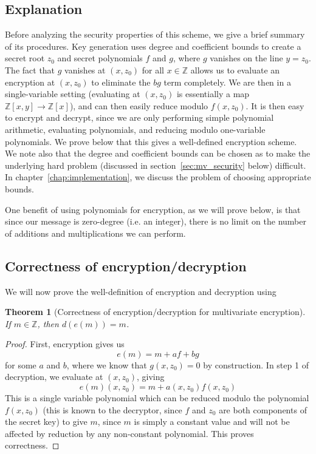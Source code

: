 \documentclass[11pt]{report}
\newtheorem{thm}{Theorem}
\newcommand{\Z}{\mathbb{Z}}
\newcommand{\ra}{\rightarrow}
\newcommand{\Zx}{\mathbb{Z}[x]}
\newcommand{\Zxy}{\mathbb{Z}[x,y]}
\begin{document}
\subsection{Explanation}
Before analyzing the security properties of this scheme, we give a brief summary of its procedures. Key generation uses degree and coefficient bounds to create a secret root $z_0$ and secret polynomials $f$ and $g$, where $g$ vanishes on the line $y=z_0$. The fact that $g$ vanishes at $(x,z_0)$ for all $x\in \Z$ allows us to evaluate an encryption at $(x,z_0)$ to eliminate the $bg$ term completely. We are then in a single-variable setting (evaluating at $(x,z_0)$ is essentially a map $\Zxy \ra \Zx$), and can then easily reduce modulo $f(x,z_0)$. It is then easy to encrypt and decrypt, since we are only performing simple polynomial arithmetic, evaluating polynomials, and reducing modulo one-variable polynomials. We prove below that this gives a well-defined encryption scheme. We note also that the degree and coefficient bounds can be chosen as to make the underlying hard problem (discussed in section~\ref{sec:mv_security} below) difficult. In chapter~\ref{chap:implementation}, we discuss the problem of choosing appropriate bounds.

One benefit of using polynomials for encryption, as we will prove below, is that since our message is zero-degree (i.e. an integer), there is no limit on the number of additions and multiplications we can perform.


\subsection{Correctness of encryption/decryption}
We will now prove the well-definition of encryption and decryption using 


\begin{thm}[Correctness of encryption/decryption for multivariate encryption] If $m\in \Z$, then $d(e(m)) = m$.
\end{thm}

\begin{proof}
First, encryption gives us
\[e(m) = m+af+bg\]
for some $a$ and $b$, where we know that $g(x,z_0)=0$ by construction. In step 1 of decryption, we evaluate at $(x,z_0)$, giving
\[e(m)(x,z_0) = m+a(x,z_0)f(x,z_0)\]
This is a single variable polynomial which can be reduced modulo the polynomial $f(x,z_0)$ (this is known to the decryptor, since $f$ and $z_0$ are both components of the secret key) to give $m$, since $m$ is simply a constant value and will not be affected by reduction by any non-constant polynomial. This proves correctness.
\end{proof}
\end{document}
